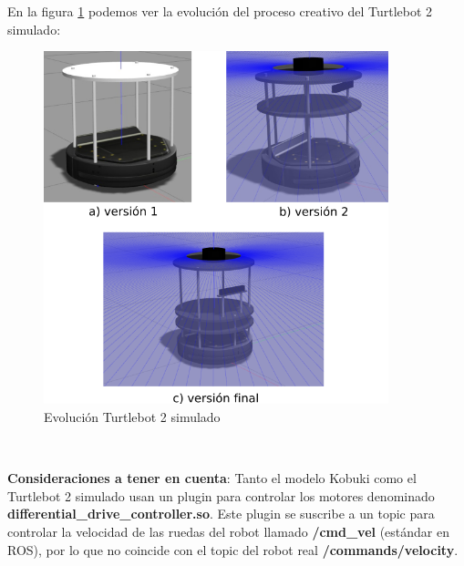 En la figura \ref{fig:evolucion_turtlebot2_sim} podemos ver la evolución del proceso creativo del Turtlebot 2 simulado:
\begin{figure} [H]
  \begin{center}
    \includegraphics[width=10cm]{imagenes/creacion-turtlebot2-sim.png}
  \end{center}
  \caption[Evolución Turtlebot 2 simulado]{Evolución Turtlebot 2 simulado}
  \label{fig:evolucion_turtlebot2_sim}
\end{figure}\


\textbf{Consideraciones a tener en cuenta}: Tanto el modelo Kobuki como el Turtlebot 2 simulado usan un plugin para controlar los motores denominado \textbf{differential\_drive\_controller.so}. Este plugin se suscribe a un topic para controlar la velocidad de las ruedas del robot llamado \textbf{/cmd\_vel} (estándar en ROS), por lo que no coincide con el topic del robot real \textbf{/commands/velocity}.


